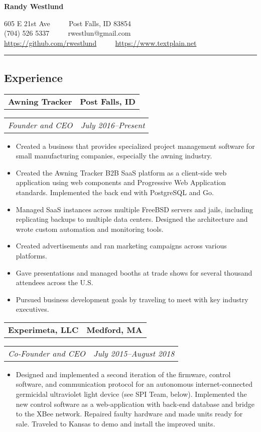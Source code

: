 \documentclass[10pt,letterpaper]{article}
\newcommand{\headerrow}[2]{%
    \begin{tabularx}{\linewidth}{Xr}
	    #1 & #2 \\
    \end{tabularx}
}
\begin{document}
\begin{center}
{\LARGE \textbf{Randy Westlund}}

605 E 21st Ave \ \ \textbullet%
    \ \ Post Falls, ID 83854 \\
(704) 526 5337 \ \ \textbullet%
    \ \ rwestlun@gmail.com \\
\url{https://github.com/rwestlund} \ \ \textbullet%
    \ \ \url{https://www.textplain.net}
\end{center}

\vspace{2pt}
\hrule
\vspace{-0.4em}
\subsection*{Experience}
	\headerrow{\textbf{Awning Tracker}}{\textbf{Post Falls, ID}}
	\headerrow{\textit{Founder and CEO}}{\textit{July 2016--Present}}
    \begin{itemize}[label=--]
        \item Created a business that provides specialized project management
            software for small manufacturing companies, especially the awning
            industry.

        \item Created the Awning Tracker B2B SaaS platform as a client-side web
            application using web components and Progressive Web Application
            standards. Implemented the back end with PostgreSQL and Go.

        \item Managed SaaS instances across multiple FreeBSD servers and jails,
            including replicating backups to multiple data centers.  Designed
            the architecture and wrote custom automation and monitoring tools.

        \item Created advertisements and ran marketing campaigns across various
            platforms.

        \item Gave presentations and managed booths at trade shows for several
            thousand attendees across the U.S.
        \item Pursued business development goals by traveling to meet with key
            industry executives.
	\end{itemize}

    \headerrow{\textbf{Experimeta, LLC}}{\textbf{Medford, MA}}
    \headerrow{\textit{Co-Founder and CEO}}{\textit{July 2015--August 2018}}
    \begin{itemize}[label=--]
        \item Designed and implemented a second iteration of the firmware,
            control software, and communication protocol for an autonomous
            internet-connected germicidal ultraviolet light device (see SPI
            Team, below).  Implemented the new control software as a
            web-application with back-end database and bridge to the XBee
            network.  Repaired faulty hardware and made units ready for sale.
            Traveled to Kansas to demo and install the improved units.
    \end{itemize}
\end{document}
